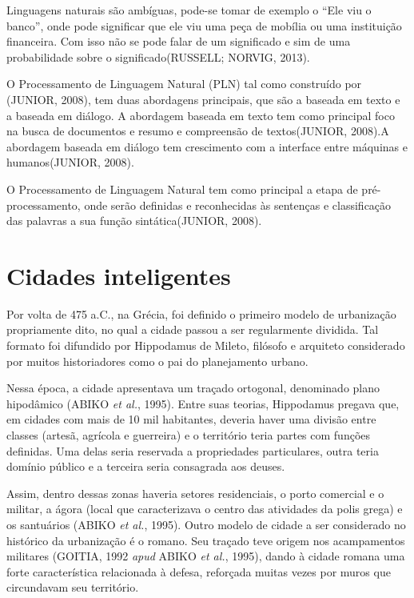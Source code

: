 Linguagens naturais são ambíguas, pode-se tomar de exemplo o “Ele viu o banco”, onde pode significar que ele viu uma peça de mobília ou uma instituição financeira. Com isso não se pode falar de um significado e sim de uma probabilidade sobre o significado(RUSSELL; NORVIG, 2013).

O Processamento de Linguagem Natural (PLN) tal como construído por (JUNIOR, 2008), tem duas abordagens principais, que são a baseada em texto e a baseada em diálogo. A abordagem baseada em texto tem como principal foco na busca de documentos e resumo e compreensão de textos(JUNIOR, 2008).A abordagem baseada em diálogo tem crescimento com a interface entre máquinas e humanos(JUNIOR, 2008). 

O Processamento de Linguagem Natural tem como principal a etapa de pré-processamento, onde serão definidas e reconhecidas às sentenças e classificação das palavras a sua função sintática(JUNIOR, 2008).

\section{Cidades inteligentes} \label{s:cidades_inteligentes}

Por volta de 475 a.C., na Grécia, foi definido o primeiro modelo de urbanização propriamente dito, no qual a cidade passou a ser regularmente dividida. Tal formato foi difundido por Hippodamus de Mileto, filósofo e arquiteto considerado por muitos historiadores como o pai do planejamento urbano.

Nessa época, a cidade apresentava um traçado ortogonal, denominado plano hipodâmico (ABIKO \textit{et al.}, 1995). Entre suas teorias, Hippodamus pregava que, em cidades com mais de 10 mil habitantes, deveria haver uma divisão entre classes (artesã, agrícola e guerreira) e o território teria partes com funções definidas. Uma delas seria reservada a propriedades particulares, outra teria domínio público e a terceira seria consagrada aos deuses.

Assim, dentro dessas zonas haveria setores residenciais, o porto comercial e o militar, a ágora (local que caracterizava o centro das atividades da polis grega) e os santuários (ABIKO \textit{et al.}, 1995).
Outro modelo de cidade a ser considerado no histórico da urbanização é o romano. Seu traçado teve origem nos acampamentos militares (GOITIA, 1992 \textit{apud} ABIKO \textit{et al.}, 1995), dando à cidade romana uma forte característica relacionada à defesa, reforçada muitas vezes por muros que circundavam seu território.

